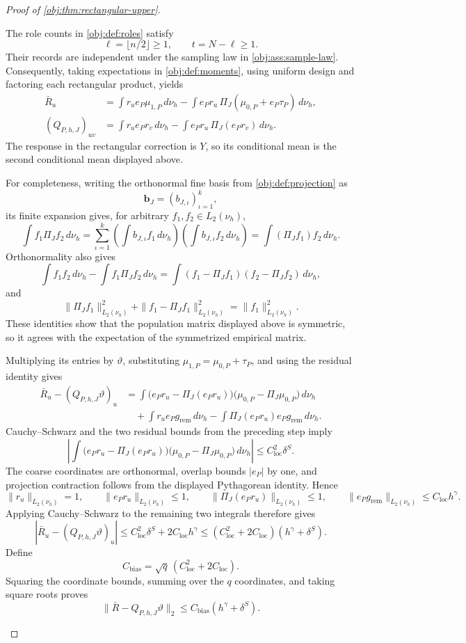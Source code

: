\documentclass[11pt]{article}
\begin{document}
\begin{proof}[Proof of \cref{obj:thm:rectangular-upper}]
\begin{enumerate}
The role counts in \cref{obj:def:roles} satisfy
\[
\ell=\lfloor n/2\rfloor\ge1,\qquad
t=N-\ell\ge1.
\]
Their records are independent under the sampling law in
\cref{obj:ass:sample-law}. Consequently, taking expectations in
\cref{obj:def:moments}, using uniform design and factoring each rectangular product, yields
\[
\begin{aligned}
\bar R_u
&=\int r_u e_P\mu_{1,P}\,d\nu_h
 -\int e_Pr_u\,\Pi_J(\mu_{0,P}+e_P\tau_P)\,d\nu_h,\\
(Q_{P,h,J})_{uv}
&=\int r_u e_Pr_v\,d\nu_h
 -\int e_Pr_u\,\Pi_J(e_Pr_v)\,d\nu_h.
\end{aligned}
\]
The response in the rectangular correction is \(Y\), so its conditional mean is the second conditional mean displayed above.

For completeness, writing the orthonormal fine basis from
\cref{obj:def:projection} as
\[
\mathbf b_J=(b_{J,\iota})_{\iota=1}^k,
\]
its finite expansion gives, for arbitrary
\(f_1,f_2\in L_2(\nu_h)\),
\[
\int f_1\Pi_Jf_2\,d\nu_h
=
\sum_{\iota=1}^k
 \left(\int b_{J,\iota} f_1\,d\nu_h\right)
 \left(\int b_{J,\iota} f_2\,d\nu_h\right)
=
\int (\Pi_Jf_1)f_2\,d\nu_h.
\]
Orthonormality also gives
\[
\int f_1f_2\,d\nu_h-\int f_1\Pi_Jf_2\,d\nu_h
=
\int(f_1-\Pi_Jf_1)(f_2-\Pi_Jf_2)\,d\nu_h,
\]
and
\[
\|\Pi_Jf_1\|_{L_2(\nu_h)}^2
+\|f_1-\Pi_Jf_1\|_{L_2(\nu_h)}^2
=\|f_1\|_{L_2(\nu_h)}^2.
\]
These identities show that the population matrix displayed above is symmetric, so it agrees with the expectation of the symmetrized empirical matrix.

Multiplying its entries by \(\vartheta\), substituting
\(\mu_{1,P}=\mu_{0,P}+\tau_P\), and using the residual identity gives
\[
\begin{aligned}
\bar R_u-(Q_{P,h,J}\vartheta)_u
&=\int
 \bigl(e_Pr_u-\Pi_J(e_Pr_u)\bigr)
 \bigl(\mu_{0,P}-\Pi_J\mu_{0,P}\bigr)\,d\nu_h\\
&\quad+\int r_u e_Pg_{\mathrm{rem}}\,d\nu_h
 -\int \Pi_J(e_Pr_u)e_Pg_{\mathrm{rem}}\,d\nu_h.
\end{aligned}
\]
Cauchy--Schwarz and the two residual bounds from the preceding step imply
\[
\left|\int
 \bigl(e_Pr_u-\Pi_J(e_Pr_u)\bigr)
 \bigl(\mu_{0,P}-\Pi_J\mu_{0,P}\bigr)\,d\nu_h\right|
\le C_{\mathrm{loc}}^2\delta^S.
\]
The coarse coordinates are orthonormal, overlap bounds \(|e_P|\) by one, and projection contraction follows from the displayed Pythagorean identity. Hence
\[
\|r_u\|_{L_2(\nu_h)}=1,\qquad
\|e_Pr_u\|_{L_2(\nu_h)}\le1,\qquad
\|\Pi_J(e_Pr_u)\|_{L_2(\nu_h)}\le1,\qquad
\|e_Pg_{\mathrm{rem}}\|_{L_2(\nu_h)}
 \le C_{\mathrm{loc}}h^\gamma.
\]
Applying Cauchy--Schwarz to the remaining two integrals therefore gives
\[
|\bar R_u-(Q_{P,h,J}\vartheta)_u|
\le C_{\mathrm{loc}}^2\delta^S+2C_{\mathrm{loc}}h^\gamma
\le
(C_{\mathrm{loc}}^2+2C_{\mathrm{loc}})
(h^\gamma+\delta^S).
\]
Define
\[
C_{\mathrm{bias}}
=\sqrt q\,(C_{\mathrm{loc}}^2+2C_{\mathrm{loc}}).
\]
Squaring the coordinate bounds, summing over the \(q\) coordinates, and taking square roots proves
\[
\|\bar R-Q_{P,h,J}\vartheta\|_2
\le C_{\mathrm{bias}}(h^\gamma+\delta^S).
\]%


\end{enumerate}
\end{proof}
\end{document}
